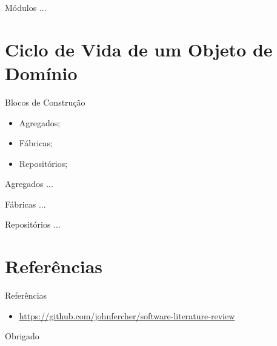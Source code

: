 \documentclass[aspectratio=169]{beamer}
\begin{document}
\begin{frame}{Módulos}	
	...
\end{frame}

\section{Ciclo de Vida de um Objeto de Domínio}
\begin{frame}{Blocos de Construção}	
	\begin{itemize}	
		\item Agregados;
		\item Fábricas;
		\item Repositórios;
	\end{itemize}
\end{frame}

\begin{frame}{Agregados}	
	...
\end{frame}

\begin{frame}{Fábricas}	
	...
\end{frame}

\begin{frame}{Repositórios}	
	...
\end{frame}

\section{Referências}
\begin{frame}{Referências}	
	\begin{itemize}	
		\item \href{https://github.com/johnfercher/software-literature-review}{https://github.com/johnfercher/software-literature-review}
	\end{itemize}
\end{frame}

\begin{frame}[standout]
  	Obrigado		
\end{frame}
\end{document}
